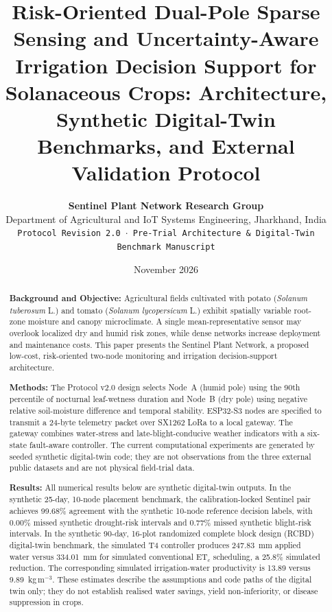 \documentclass[10pt,twocolumn,a4paper]{article}
\title{\vspace{-8mm}\textbf{\Large\color{primary} Risk-Oriented Dual-Pole Sparse Sensing and Uncertainty-Aware Irrigation Decision Support for Solanaceous Crops: Architecture, Synthetic Digital-Twin Benchmarks, and External Validation Protocol}}
\author{
  \textbf{Sentinel Plant Network Research Group}\\
  \small Department of Agricultural and IoT Systems Engineering, Jharkhand, India\\
  \small \texttt{Protocol Revision 2.0 $\cdot$ Pre-Trial Architecture \& Digital-Twin Benchmark Manuscript}
}
\date{\vspace{-3mm}\small November 2026}
\begin{document}
\maketitle
\thispagestyle{fancy}

\begin{abstract}
\noindent\textbf{Background and Objective:} Agricultural fields cultivated with potato (\textit{Solanum tuberosum} L.) and tomato (\textit{Solanum lycopersicum} L.) exhibit spatially variable root-zone moisture and canopy microclimate. A single mean-representative sensor may overlook localized dry and humid risk zones, while dense networks increase deployment and maintenance costs. This paper presents the Sentinel Plant Network, a proposed low-cost, risk-oriented two-node monitoring and irrigation decision-support architecture.

\textbf{Methods:} The Protocol v2.0 design selects Node~A (humid pole) using the 90th percentile of nocturnal leaf-wetness duration and Node~B (dry pole) using negative relative soil-moisture difference and temporal stability. ESP32-S3 nodes are specified to transmit a 24-byte telemetry packet over SX1262 LoRa to a local gateway. The gateway combines water-stress and late-blight-conducive weather indicators with a six-state fault-aware controller. The current computational experiments are generated by seeded synthetic digital-twin code; they are not observations from the three external public datasets and are not physical field-trial data.

\textbf{Results:} All numerical results below are synthetic digital-twin outputs. In the synthetic 25-day, 10-node placement benchmark, the calibration-locked Sentinel pair achieves 99.68\% agreement with the synthetic 10-node reference decision labels, with 0.00\% missed synthetic drought-risk intervals and 0.77\% missed synthetic blight-risk intervals. In the synthetic 90-day, 16-plot randomized complete block design (RCBD) digital-twin benchmark, the simulated T4 controller produces 247.83~mm applied water versus 334.01~mm for simulated conventional ET$_c$ scheduling, a 25.8\% simulated reduction. The corresponding simulated irrigation-water productivity is 13.89 versus 9.89~kg\,m$^{-3}$. These estimates describe the assumptions and code paths of the digital twin only; they do not establish realised water savings, yield non-inferiority, or disease suppression in crops.


\end{abstract}
\end{document}
